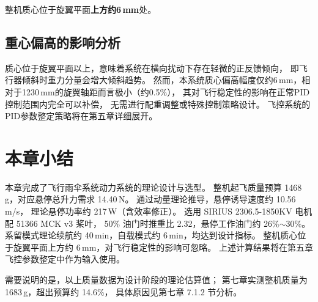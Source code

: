 整机质心位于旋翼平面\textbf{上方约6\,mm}处。

\subsection{重心偏高的影响分析}

质心位于旋翼平面以上，意味着系统在横向扰动下存在轻微的正反馈倾向，
即飞行器倾斜时重力分量会增大倾斜趋势。
然而，本系统质心偏高幅度仅约6\,mm，相对于1230\,mm的旋翼轴距而言极小（约0.5\%），
其对飞行稳定性的影响在正常PID控制范围内完全可以补偿，
无需进行配重调整或特殊控制策略设计。
飞控系统的PID参数整定策略将在第五章详细展开。


\section{本章小结}

本章完成了飞行雨伞系统动力系统的理论设计与选型。
整机起飞质量预算 1468\,g，对应悬停总升力需求 14.40\,N。
通过动量理论推导，悬停诱导速度约 10.56\,m/s，
理论悬停功率约 217\,W（含效率修正）。
选用 SIRIUS 2306.5-1850KV 电机配 51366 MCK v3 桨叶，
50\% 油门时推重比 2.32，悬停工作油门约 26\%$\sim$30\%。
系留模式理论续航约 40\,min，自载模式约 6\,min，均达到设计指标。
整机质心位于旋翼平面上方约 6\,mm，对飞行稳定性的影响可忽略。
上述计算结果将在第五章飞控参数整定中作为输入使用。

需要说明的是，以上质量数据为设计阶段的理论估算值；
第七章实测整机质量为 1683\,g，超出预算约 14.6\%，
具体原因见第七章 7.1.2 节分析。
